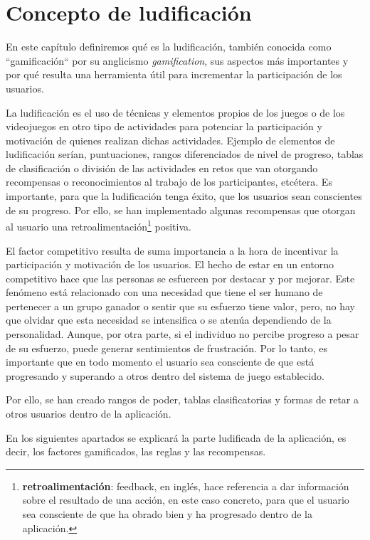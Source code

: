 \section{Concepto de ludificación}
En este capítulo definiremos qué es la ludificación, también conocida como ``gamificación``\cite{definicionGamificacion} por su anglicismo \textit{gamification}, sus aspectos más importantes y por qué resulta una herramienta útil para incrementar la participación de los usuarios.

La ludificación es el uso de técnicas y elementos propios de los juegos o de los videojuegos en otro tipo de actividades para potenciar la participación y motivación de quienes realizan dichas actividades. Ejemplo de elementos de ludificación serían, puntuaciones, rangos diferenciados de nivel de progreso, tablas de clasificación o división de las actividades en retos que van otorgando recompensas o reconocimientos al trabajo de los participantes, etcétera. Es importante, para que la ludificación tenga éxito, que los usuarios sean conscientes de su progreso. Por ello, se han implementado algunas recompensas que otorgan al usuario una retroalimentación\footnote{\textbf{retroalimentación}: feedback, en inglés, hace referencia a dar información sobre el resultado de una acción, en este caso concreto, para que el usuario sea consciente de que ha obrado bien y ha progresado dentro de la aplicación.} positiva.

El factor competitivo resulta de suma importancia a la hora de incentivar la participación y motivación de los usuarios\cite{caponetto2014gamification}. El hecho de estar en un entorno competitivo hace que las personas se esfuercen por destacar y por mejorar\cite{alsawaier2018effect}. Este fenómeno está relacionado con una necesidad que tiene el ser humano de pertenecer a un grupo ganador o sentir que su esfuerzo tiene valor, pero, no hay que olvidar que esta necesidad se intensifica o se atenúa dependiendo de la personalidad\cite{ghaban2019different}. Aunque, por otra parte, si el individuo no percibe progreso a pesar de su esfuerzo, puede generar sentimientos de frustración\cite{nicholson2015recipe}. Por lo tanto, es importante que en todo momento el usuario sea consciente de que está progresando y superando a otros dentro del sistema de juego establecido.

Por ello, se han creado rangos de poder, tablas clasificatorias y formas de retar a otros usuarios dentro de la aplicación.

En los siguientes apartados se explicará la parte ludificada de la aplicación, es decir, los factores gamificados, las reglas y las recompensas.

